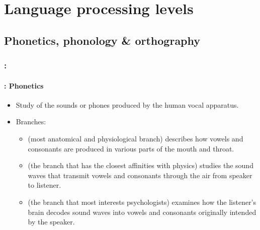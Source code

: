 \documentclass[xcolor=table]{beamer}
\begin{document}
\section{Language processing levels}

\begin{frame}
	\frametitle{\insertshortsubtitle}
	\framesubtitle{\insertsection}

	\begin{center}
	\end{center}

\end{frame}

\subsection{Phonetics, phonology \& orthography}

\begin{frame}
	\frametitle{\insertshortsubtitle: \insertsection}
	\framesubtitle{\insertsubsection: Phonetics}

	\begin{itemize}
		\item Study of the sounds or phones produced by the human vocal apparatus.
		\item Branches:
		\begin{itemize}
			\item {} (most anatomical and physiological branch) describes how vowels and consonants are produced in various parts of the mouth and throat.
			\item {} (the branch that has the closest affinities with physics) studies the sound waves that transmit vowels and consonants through the air from speaker to listener.
			\item {} (the branch that most interests psychologists) examines how the listener's brain decodes sound waves into vowels and consonants originally intended by the speaker.
		\end{itemize}
	\end{itemize}

\end{frame}
\end{document}
